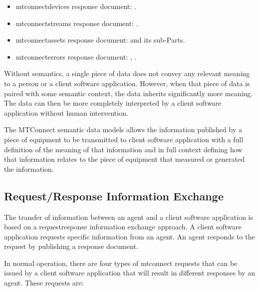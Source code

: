 \begin{itemize}
\item \gls{mtconnectdevices response document}:  . 

\item \gls{mtconnectstreams response document}:  .

\item \gls{mtconnectassets response document}:   and its sub-Parts.

\item \gls{mtconnecterrors response document}:  , .
\end{itemize}

Without semantics, a single piece of data does not convey any relevant meaning to a person or a client software application.  However, when that piece of data is paired with some semantic context, the data inherits significantly more meaning.  The data can then be more completely interpreted by a client software application without human intervention.

The MTConnect \glspl{semantic data model} allows the information published by a piece of equipment to be transmitted to client software application with a full definition of the meaning of that information and in full context defining how that information relates to the piece of equipment that measured or generated the information.

\subsection{Request/Response Information Exchange}
\label{sec:Request/Response Information Exchange}

The transfer of information between an \gls{agent} and a client software application is based on a \gls{requestresponse} information exchange approach.   A client software application requests specific information from an \gls{agent}.  An \gls{agent} responds to the \gls{request} by publishing a \gls{response document}.

In normal operation, there are four types of \glspl{mtconnect request} that can be issued by a client software application that will result in different \glspl{response} by an \gls{agent}.  These \glspl{request} are:

